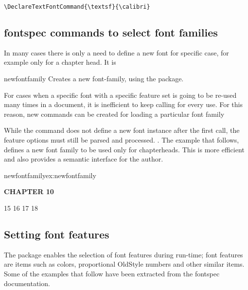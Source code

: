 \begin{verbatim}
\DeclareTextFontCommand{\textsf}{\calibri}
\end{verbatim}

\subsection{fontspec commands to select font families}

In many cases there is only a need to define a new font for specific case, for example only for a chapter head. It is 

\begin{docCmd} {newfontfamily} { }
  Creates a new font-family, using the  package.
\end{docCmd}

For cases when a specific font with a specific feature set is going to be re-used
many times in a document, it is inefficient to keep calling  for every use. For this reason, new commands can be created for loading a particular font family

While the  command does not define a new font instance after the first
call, the feature options must still be parsed and processed.
. The example that follows, defines a new font family to be used only for chapterheads. This is more efficient and also provides a semantic interface for the author.

\begin{texexample}{newfontfamily}{ex:newfontfamily}
 
\newfontfamily{}
\def\setchapterfont{%
   \calibri\huge\bfseries}

\bgroup
\setchapterfont CHAPTER 10
\egroup
\end{texexample}

\begin{teX}
15 \DeclareTextFontCommand{\textrm}{\rmfamily}
16 \DeclareTextFontCommand{\textsf}{\sffamily}
17 \DeclareTextFontCommand{\texttt}{\ttfamily}
18 \DeclareTextFontCommand{\textnormal}{\normalfont}
\end{teX}

\subsection{Setting font features}

The  package enables the selection of font features during run-time; font features are items such as colors, proportional OldStyle numbers and other similar items. Some of the examples that follow have been extracted from the fontspec documentation.

